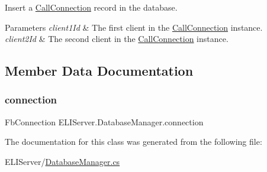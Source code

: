 Insert a \hyperlink{class_e_l_i_server_1_1_call_connection}{Call\+Connection} record in the database. 


\begin{DoxyParams}{Parameters}
{\em client1\+Id} & The first client in the \hyperlink{class_e_l_i_server_1_1_call_connection}{Call\+Connection} instance.\\
\hline
{\em client2\+Id} & The second client in the \hyperlink{class_e_l_i_server_1_1_call_connection}{Call\+Connection} instance.\\
\hline
\end{DoxyParams}


\subsection{Member Data Documentation}
\mbox{\label{class_e_l_i_server_1_1_database_manager_a34b35f163316da5270e526b1d0f51889}} 
\subsubsection{\texorpdfstring{connection}{connection}}
{\footnotesize\ttfamily Fb\+Connection E\+L\+I\+Server.\+Database\+Manager.\+connection\hspace{0.3cm}{\ttfamily [private]}}



The documentation for this class was generated from the following file\+:\begin{DoxyCompactItemize}
\item 
E\+L\+I\+Server/\hyperlink{_database_manager_8cs}{Database\+Manager.\+cs}\end{DoxyCompactItemize}

